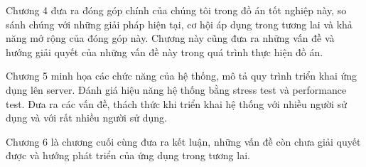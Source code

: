 Chương 4 đưa ra đóng góp chính của chúng tôi trong đồ án tốt nghiệp này,
so sánh chúng với những giải pháp hiện tại, cơ hội áp dụng trong
tương lai và khả năng mở rộng của đóng góp này. Chương này cũng
đưa ra những vấn đề và hướng giải quyết của những vấn đề này
trong quá trình thực hiện đồ án. 

Chương 5 minh họa các chức năng của hệ thống, mô tả quy trình
triển khai ứng dụng lên server. Đánh giá hiệu năng hệ thống bằng
stress test và performance test. Đưa ra các vấn đề, thách thức
khi triển khai hệ thống với nhiều người sử dụng và với rất
nhiều người sử dụng.

Chương 6 là chương cuối cùng đưa ra kết luận, những vấn đề còn
chưa giải quyết được và hướng phát triển của ứng dụng trong tương lai.
